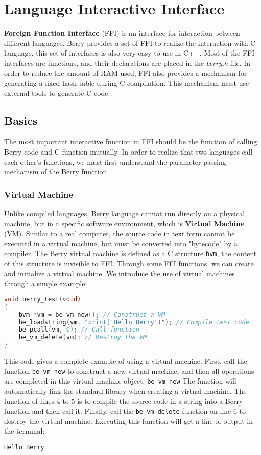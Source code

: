 \chapter{Language Interactive Interface}

\textbf{Foreign Function Interface} (FFI) is an interface for interaction between different languages. Berry provides a set of FFI to realize the interaction with C language, this set of interfaces is also very easy to use in C++. Most of the FFI interfaces are functions, and their declarations are placed in the \textsl{berry.h} file. In order to reduce the amount of RAM used, FFI also provides a mechanism for generating a fixed hash table during C compilation. This mechanism must use external tools to generate C code.

\section {Basics}

The most important interactive function in FFI should be the function of calling Berry code and C function mutually. In order to realize that two languages   call each other's functions, we must first understand the parameter passing mechanism of the Berry function.

\subsection {Virtual Machine}

Unlike compiled languages, Berry language cannot run directly on a physical machine, but in a specific software environment, which is \textbf{Virtual Machine} (VM). Similar to a real computer, the source code in text form cannot be executed in a virtual machine, but must be converted into "bytecode" by a compiler. The Berry virtual machine is defined as a C structure \texttt{bvm}, the content of this structure is invisible to FFI. Through some FFI functions, we can create and initialize a virtual machine. We introduce the use of virtual machines through a simple example:
\begin{lstlisting}[language=c, style=berry]
void berry_test(void)
{
    bvm *vm = be_vm_new(); // Construct a VM
    be_loadstring(vm, "print('Hello Berry')"); // Compile test code
    be_pcall(vm, 0); // Call function
    be_vm_delete(vm); // Destroy the VM
}
\end{lstlisting}
This code gives a complete example of using a virtual machine. First, call the function \texttt{be\_vm\_new} to construct a new virtual machine, and then all operations are completed in this virtual machine object. \texttt{be\_vm\_new} The function will automatically link the standard library when creating a virtual machine. The function of lines 4 to 5 is to compile the source code in a string into a Berry function and then call it. Finally, call the \texttt{be\_vm\_delete} function on line 6 to destroy the virtual machine. Executing this function will get a line of output in the terminal:
\begin{lstlisting}[numbers=none]
Hello Berry
\end{lstlisting}

